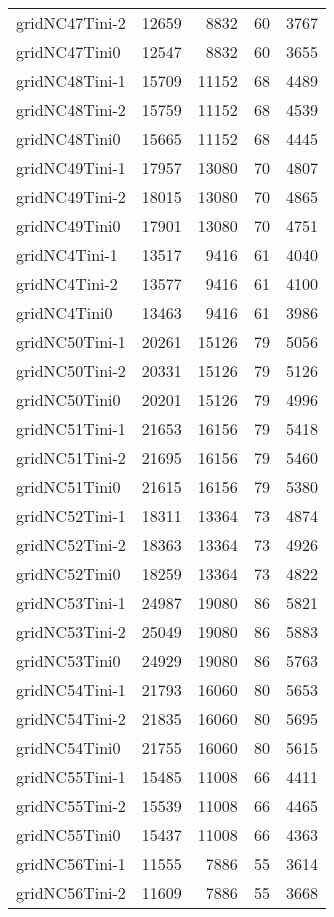 \begin{tabular}{lrrrr}
gridNC47Tini-2 & 12659 & 8832 & 60 & 3767 \\
gridNC47Tini0 & 12547 & 8832 & 60 & 3655 \\
gridNC48Tini-1 & 15709 & 11152 & 68 & 4489 \\
gridNC48Tini-2 & 15759 & 11152 & 68 & 4539 \\
gridNC48Tini0 & 15665 & 11152 & 68 & 4445 \\
gridNC49Tini-1 & 17957 & 13080 & 70 & 4807 \\
gridNC49Tini-2 & 18015 & 13080 & 70 & 4865 \\
gridNC49Tini0 & 17901 & 13080 & 70 & 4751 \\
gridNC4Tini-1 & 13517 & 9416 & 61 & 4040 \\
gridNC4Tini-2 & 13577 & 9416 & 61 & 4100 \\
gridNC4Tini0 & 13463 & 9416 & 61 & 3986 \\
gridNC50Tini-1 & 20261 & 15126 & 79 & 5056 \\
gridNC50Tini-2 & 20331 & 15126 & 79 & 5126 \\
gridNC50Tini0 & 20201 & 15126 & 79 & 4996 \\
gridNC51Tini-1 & 21653 & 16156 & 79 & 5418 \\
gridNC51Tini-2 & 21695 & 16156 & 79 & 5460 \\
gridNC51Tini0 & 21615 & 16156 & 79 & 5380 \\
gridNC52Tini-1 & 18311 & 13364 & 73 & 4874 \\
gridNC52Tini-2 & 18363 & 13364 & 73 & 4926 \\
gridNC52Tini0 & 18259 & 13364 & 73 & 4822 \\
gridNC53Tini-1 & 24987 & 19080 & 86 & 5821 \\
gridNC53Tini-2 & 25049 & 19080 & 86 & 5883 \\
gridNC53Tini0 & 24929 & 19080 & 86 & 5763 \\
gridNC54Tini-1 & 21793 & 16060 & 80 & 5653 \\
gridNC54Tini-2 & 21835 & 16060 & 80 & 5695 \\
gridNC54Tini0 & 21755 & 16060 & 80 & 5615 \\
gridNC55Tini-1 & 15485 & 11008 & 66 & 4411 \\
gridNC55Tini-2 & 15539 & 11008 & 66 & 4465 \\
gridNC55Tini0 & 15437 & 11008 & 66 & 4363 \\
gridNC56Tini-1 & 11555 & 7886 & 55 & 3614 \\
gridNC56Tini-2 & 11609 & 7886 & 55 & 3668 \\

\end{tabular}
